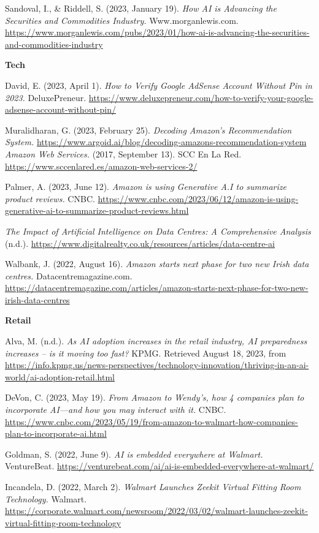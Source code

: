\documentclass[
]{article}
\begin{document}
Sandoval, I., \& Riddell, S. (2023, January 19). \emph{How AI is Advancing the Securities and Commodities Industry.} Www.morganlewis.com. \url{https://www.morganlewis.com/pubs/2023/01/how-ai-is-advancing-the-securities-and-commodities-industry}

\textbf{Tech}

David, E. (2023, April 1). \emph{How to Verify Google AdSense Account Without Pin in 2023.} DeluxePreneur. \url{https://www.deluxepreneur.com/how-to-verify-your-google-adsense-account-without-pin/}

Muralidharan, G. (2023, February 25). \emph{Decoding Amazon's Recommendation System.} \url{https://www.argoid.ai/blog/decoding-amazons-recommendation-system}
\emph{Amazon Web Services.} (2017, September 13). SCC En La Red. \url{https://www.sccenlared.es/amazon-web-services-2/}

Palmer, A. (2023, June 12). \emph{Amazon is using Generative A.I to summarize product reviews.} CNBC. \url{https://www.cnbc.com/2023/06/12/amazon-is-using-generative-ai-to-summarize-product-reviews.html}

\emph{The Impact of Artificial Intelligence on Data Centres: A Comprehensive Analysis} (n.d.). \url{https://www.digitalrealty.co.uk/resources/articles/data-centre-ai}

Walbank, J. (2022, August 16). \emph{Amazon starts next phase for two new Irish data centres.} Datacentremagazine.com. \url{https://datacentremagazine.com/articles/amazon-starts-next-phase-for-two-new-irish-data-centres}

\textbf{Retail}

Alva, M. (n.d.). \emph{As AI adoption increases in the retail industry, AI preparedness increases -- is it moving too fast?} KPMG. Retrieved August 18, 2023, from \url{https://info.kpmg.us/news-perspectives/technology-innovation/thriving-in-an-ai-world/ai-adoption-retail.html}

DeVon, C. (2023, May 19). \emph{From Amazon to Wendy's, how 4 companies plan to incorporate AI---and how you may interact with it.} CNBC. \url{https://www.cnbc.com/2023/05/19/from-amazon-to-walmart-how-companies-plan-to-incorporate-ai.html}

Goldman, S. (2022, June 9). \emph{AI is embedded everywhere at Walmart.} VentureBeat. \url{https://venturebeat.com/ai/ai-is-embedded-everywhere-at-walmart/}

Incandela, D. (2022, March 2). \emph{Walmart Launches Zeekit Virtual Fitting Room Technology.} Walmart. \url{https://corporate.walmart.com/newsroom/2022/03/02/walmart-launches-zeekit-virtual-fitting-room-technology}
\end{document}
